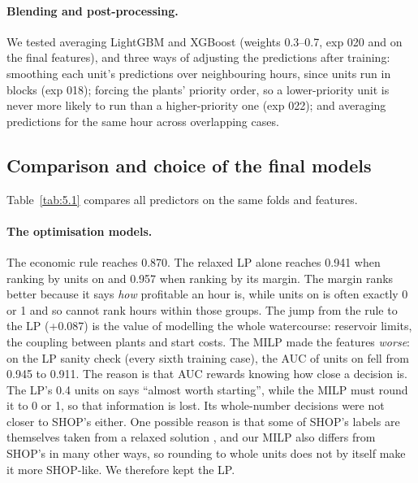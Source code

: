 \paragraph{Blending and post-processing.} We tested averaging LightGBM and XGBoost (weights 0.3--0.7, exp 020 and on the final features), and three ways of adjusting the predictions after training: smoothing each unit's predictions over neighbouring hours, since units run in blocks (exp 018); forcing the plants' priority order, so a lower-priority unit is never more likely to run than a higher-priority one (exp 022); and averaging predictions for the same hour across overlapping cases.

\subsection{Comparison and choice of the final models}\label{sec:5.compare}

Table~\ref{tab:5.1} compares all predictors on the same folds and features.

\begin{table}[H]
  \centering\small
  \caption{Predictor types on the same folds (A–D)}
  \label{tab:5.1}
\end{table}

\paragraph{The optimisation models.} The economic rule reaches 0.870. The relaxed LP alone reaches 0.941 when ranking by units on and 0.957 when ranking by its margin. The margin ranks better because it says \emph{how} profitable an hour is, while units on is often exactly 0 or 1 and so cannot rank hours within those groups. The jump from the rule to the LP (+0.087) is the value of modelling the whole watercourse: reservoir limits, the coupling between plants and start costs. The MILP made the features \emph{worse}: on the LP sanity check (every sixth training case), the AUC of units on fell from 0.945 to 0.911. The reason is that AUC rewards knowing how close a decision is. The LP's 0.4 units on says ``almost worth starting'', while the MILP must round it to 0 or 1, so that information is lost. Its whole-number decisions were not closer to SHOP's either. One possible reason is that some of SHOP's labels are themselves taken from a relaxed solution \citep{barjaktarevic2026}, and our MILP also differs from SHOP's in many other ways, so rounding to whole units does not by itself make it more SHOP-like. We therefore kept the LP.

